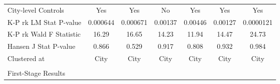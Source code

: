 \documentclass[11pt,a4paper]{article}
\begin{document}
\begin{landscape}
\begin{center}
\begin{scriptsize}
{\begin{tabular}{l*{6}{c}}
City-level Controls &   Yes         &  Yes        &    No & Yes  &  Yes  &  Yes    \\
K-P rk LM Stat P-value          &    0.000644         &    0.000671         &     0.00137         &     0.00446         &     0.00127        &      0.0000121       \\
K-P rk Wald F Statistic    &       16.29         &       16.65         &       14.23         &       11.94         &       14.47        &        24.73         \\
Hansen J Stat P-value   &       0.866         &       0.529         &       0.917         &       0.808         &     0.932       &       0.984       \\
Clustered at    &        City       &        City       &        City       &        City       &        City       &        City       \\
\hline\hline

\\
First-Stage Results  &   &    & \\
[0.5em]


\end{tabular}}
\end{scriptsize}
\end{center}
\end{landscape}
\end{document}

